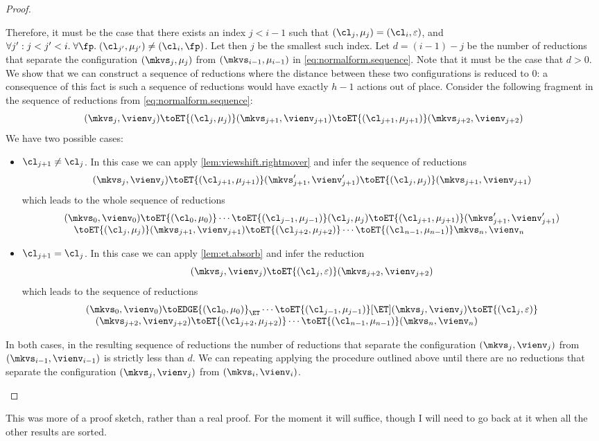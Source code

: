 \begin{proof}
\begin{enumerate}
Therefore, it must be the case that there exists an index $j < i-1$ such that $(\cl_{j}, \mu_{j}) = (\cl_{i}, \varepsilon)$, 
and $\forall j': j< j' < i.\;\forall \fp.\;(\cl_{j'}, \mu_{j'}) \neq (\cl_{i}, \fp)$. Let then $j$ be the smallest such index. 
Let $d = (i-1)-j$ be the number of reductions that separate the configuration $(\mkvs_{j}, \mu_{j})$ from 
$(\mkvs_{i-1}, \mu_{i-1})$ in \cref{eq:normalform.sequence}. Note that it must be the case that $d > 0$. We show that we can 
construct a sequence of reductions where the distance between these two configurations is reduced to $0$: 
a consequence of this fact is such a sequence of reductions would have exactly $h-1$ actions out of place.
Consider the following fragment in the sequence of reductions from \cref{eq:normalform.sequence}:
\[
(\mkvs_{j}, \vienv_{j}) \toET{(\cl_{j}, \mu_{j})} (\mkvs_{j+1}, \vienv_{j+1}) 
\toET{(\cl_{j+1}, \mu_{j+1})} (\mkvs_{j+2}, \vienv_{j+2})
\]
We have two possible cases: 
\begin{itemize}
\item $\cl_{j+1} \neq \cl_{j}$. In this case we can apply \cref{lem:viewshift.rightmover} and infer the sequence of 
reductions 
\[
(\mkvs_{j}, \vienv_{j}) \toET{(\cl_{j+1}, \mu_{j+1})} (\mkvs_{j+1}', \vienv_{j+1}') 
\toET{(\cl_{j}, \mu_{j})} (\mkvs_{j+1}, \vienv_{j+1})
\]
which leads to the whole sequence of reductions 
\[
\begin{array}{@{}l@{}}
(\mkvs_{0}, \vienv_{0}) \toET{(\cl_{0}, \mu_{0})} \cdots 
\toET{(\cl_{j-1}, \mu_{j-1})} (\cl_{j}, \mu_{j}) 
\toET{(\cl_{j+1}, \mu_{j+1})} (\mkvs'_{j+1}, \vienv'_{j+1})  \\
\quad \toET{(\cl_{j}, \mu_{j})} (\mkvs_{j+1}, \vienv_{j+1})  
\toET{(\cl_{j+2}, \mu_{j+2})} \cdots \toET{(\cl_{n-1}, \mu_{n-1})} \mkvs_{n}, \vienv_{n}
\end{array}
\]
\item $\cl_{j+1} = \cl_{j}$. In this case we can apply \cref{lem:et.absorb} and infer the reduction 
\[
(\mkvs_{j}, \vienv_{j}) \toET{(\cl_{j}, \varepsilon)} (\mkvs_{j+2}, \vienv_{j+2})
\]
which leads to the sequence of reductions 
\[
\begin{array}{@{}l@{}}
(\mkvs_{0}, \vienv_{0}) \toEDGE{(\cl_{0}, \mu_{0})}_{\ET} \cdots 
\toET{(\cl_{j-1}, \mu_{j-1})}[\ET] (\mkvs_{j}, \vienv_{j}) \toET{(\cl_{j}, \varepsilon)}  \\
\quad (\mkvs_{j+2}, \vienv_{j+2}) \toET{(\cl_{j+2}, \mu_{j+2})} \cdots 
\toET{(\cl_{n-1}, \mu_{n-1})} (\mkvs_{n}, \vienv_{n})
\end{array}
\]
\end{itemize}
In both cases, in the resulting sequence of reductions the number of reductions that separate 
the configuration $(\mkvs_{j}, \vienv_{j})$ from $(\mkvs_{i-1}, \vienv_{i-1})$ is strictly 
less than $d$. We can repeating applying the procedure outlined above until there are 
no reductions that separate the configuration $(\mkvs_{j}, \vienv_{j})$ from 
$(\mkvs_{i}, \vienv_{i})$.
\end{enumerate}
\end{proof}
\ac{This was more of a proof sketch, rather than a real proof. For the moment it will suffice, though 
I will need to go back at it when all the other results are sorted.}


